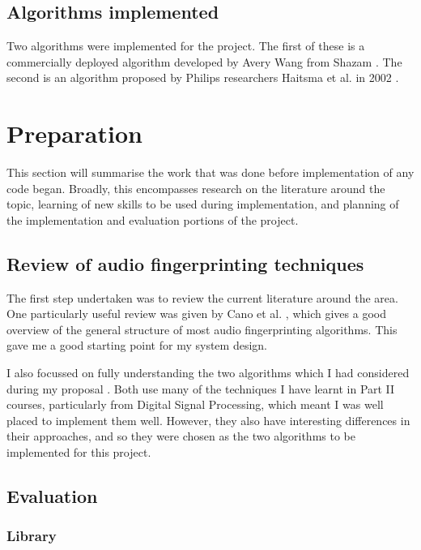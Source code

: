 \documentclass[12pt,a4paper,twoside,openright]{report}
\begin{document}
\section{Algorithms implemented}

Two algorithms were implemented for the project. The first of these is a commercially deployed algorithm developed by Avery Wang from Shazam \cite{Wang03}. The second is an algorithm proposed by Philips researchers Haitsma et al. in 2002 \cite{Haitsma02}.



\chapter{Preparation}

This section will summarise the work that was done before implementation of any code began. Broadly, this encompasses research on the literature around the topic, learning of new skills to be used during implementation, and planning of the implementation and evaluation portions of the project.


\section{Review of audio fingerprinting techniques}

The first step undertaken was to review the current literature around the area. One particularly useful review was given by Cano et al. \cite{Cano02}, which gives a good overview of the general structure of most audio fingerprinting algorithms. This gave me a good starting point for my system design.

I also focussed on fully understanding the two algorithms which I had considered during my proposal \cite{Haitsma02} \cite{Wang03}. Both use many of the techniques I have learnt in Part II courses, particularly from Digital Signal Processing, which meant I was well placed to implement them well. However, they also have interesting differences in their approaches, and so they were chosen as the two algorithms to be implemented for this project.


\section{Evaluation}

\subsection{Library}
\end{document}
